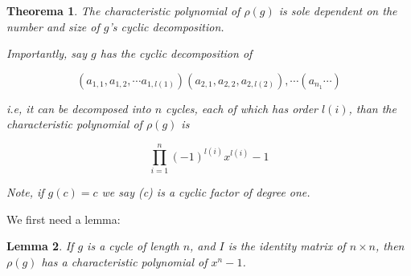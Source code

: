 \documentclass[12pt, a4paper]{article}
\title{}
\author{}
\date{}
\newtheorem{theorem}{Theorema}[subsection]
\newtheorem{lemma}[theorem]{Lemma}
\theoremstyle{definition}
\theoremstyle{remark}
\begin{document}
\maketitle
\begin{theorem}\label{ToProve}
  The characteristic polynomial of $\rho(g)$ is sole dependent on the number and size of $g$'s cyclic decomposition.

Importantly, say $g$ has the cyclic decomposition of 

$$
(a_{1,1}, a_{1,2},\cdots a_{1, l(1)} )(a_{2,1}, a_{2,2}, a_{2, l(2)}), \cdots (a_{n_1} \cdots)
$$

i.e, it can be decomposed into $n$ cycles, each of which has order $l(i)$, than the characteristic polynomial of $\rho(g)$ is 

$$
\prod_{i=1}^{n}  (-1)^{l(i)} x^{l(i)}-1
$$

Note, if $g(c)=c$ we say (c) is a cyclic factor of degree one.
  
\end{theorem}

We first need a lemma:
\begin{lemma}\label{lem:1}
	If $g$ is a cycle of length $n$, and $I$ is the identity matrix of $n \times n$, then $\rho(g)$ has a characteristic polynomial of $x^n-1$.
\end{lemma}
\end{document}
